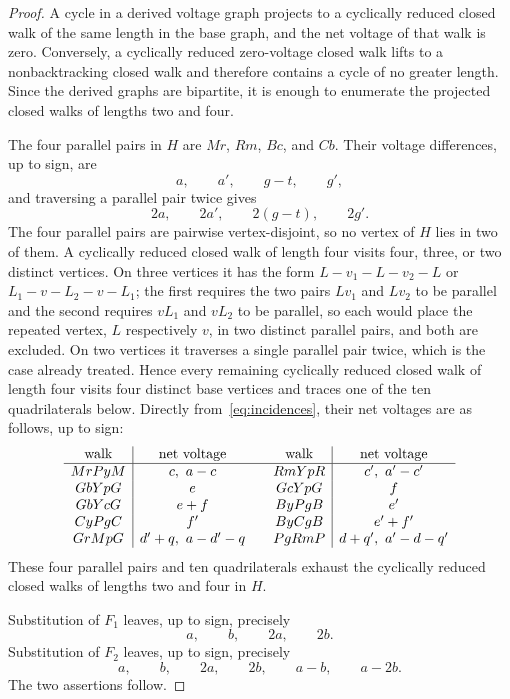 \documentclass[11pt]{amsart}
\theoremstyle{remark}
\begin{document}
\begin{proof}
A cycle in a derived voltage graph projects to a cyclically reduced closed
walk of the same length in the base graph, and the net voltage of that walk
is zero. Conversely, a cyclically reduced zero-voltage closed walk lifts to
a nonbacktracking closed walk and therefore contains a cycle of no greater
length. Since the derived graphs are bipartite, it is enough to enumerate
the projected closed walks of lengths two and four.

The four parallel pairs in $H$ are $Mr$, $Rm$, $Bc$, and $Cb$. Their
voltage differences, up to sign, are
\[
a,\qquad a',\qquad g-t,\qquad g',
\]
and traversing a parallel pair twice gives
\[
2a,\qquad 2a',\qquad 2(g-t),\qquad 2g'.
\]
The four parallel pairs are pairwise vertex-disjoint, so no vertex of $H$
lies in two of them. A cyclically reduced closed walk of length four visits
four, three, or two distinct vertices. On three vertices it has the form
$L-v_1-L-v_2-L$ or $L_1-v-L_2-v-L_1$; the first requires the two pairs
$Lv_1$ and $Lv_2$ to be parallel and the second requires $vL_1$ and $vL_2$ to
be parallel, so each would place the repeated vertex, $L$ respectively $v$,
in two distinct parallel pairs, and both are excluded. On two vertices it
traverses a single parallel pair twice, which is the case already treated.
Hence every remaining cyclically reduced closed walk of length four visits
four distinct base vertices and traces one of the ten quadrilaterals below.
Directly
from~\eqref{eq:incidences}, their net voltages are as follows, up to sign:
\[
\begin{array}{c|c@{\qquad}c|c}
\text{walk} & \text{net voltage} & \text{walk} & \text{net voltage}\\ \hline
MrPyM & c,\ a-c
  & RmYpR & c',\ a'-c'\\
GbYpG & e
  & GcYpG & f\\
GbYcG & e+f
  & ByPgB & e'\\
CyPgC & f'
  & ByCgB & e'+f'\\
GrMpG & d'+q,\ a-d'-q
  & PgRmP & d+q',\ a'-d-q'
\end{array}
\]
These four parallel pairs and ten quadrilaterals exhaust the cyclically
reduced closed walks of lengths two and four in $H$.

Substitution of $F_1$ leaves, up to sign, precisely
\[
a,\qquad b,\qquad 2a,\qquad 2b.
\]
Substitution of $F_2$ leaves, up to sign, precisely
\[
a,\qquad b,\qquad 2a,\qquad 2b,\qquad a-b,\qquad a-2b.
\]
The two assertions follow.
\end{proof}
\end{document}

